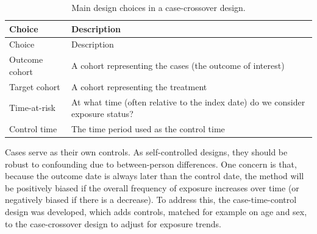 \documentclass[11pt]{book}
\theoremstyle{definition}
\theoremstyle{definition}
\theoremstyle{definition}
\theoremstyle{remark}
\begin{document}
\begin{longtable}[]{@{}ll@{}}
\caption{\label{tab:ccrChoices} Main design choices in a case-crossover design.}\tabularnewline
\toprule
\begin{minipage}[b]{0.23\columnwidth}\raggedright
Choice\strut
\end{minipage} & \begin{minipage}[b]{0.72\columnwidth}\raggedright
Description\strut
\end{minipage}\tabularnewline
\midrule
\endfirsthead
\toprule
\begin{minipage}[b]{0.23\columnwidth}\raggedright
Choice\strut
\end{minipage} & \begin{minipage}[b]{0.72\columnwidth}\raggedright
Description\strut
\end{minipage}\tabularnewline
\midrule
\endhead
\begin{minipage}[t]{0.23\columnwidth}\raggedright
Outcome cohort\strut
\end{minipage} & \begin{minipage}[t]{0.72\columnwidth}\raggedright
A cohort representing the cases (the outcome of interest)\strut
\end{minipage}\tabularnewline
\begin{minipage}[t]{0.23\columnwidth}\raggedright
Target cohort\strut
\end{minipage} & \begin{minipage}[t]{0.72\columnwidth}\raggedright
A cohort representing the treatment\strut
\end{minipage}\tabularnewline
\begin{minipage}[t]{0.23\columnwidth}\raggedright
Time-at-risk\strut
\end{minipage} & \begin{minipage}[t]{0.72\columnwidth}\raggedright
At what time (often relative to the index date) do we consider exposure status?\strut
\end{minipage}\tabularnewline
\begin{minipage}[t]{0.23\columnwidth}\raggedright
Control time\strut
\end{minipage} & \begin{minipage}[t]{0.72\columnwidth}\raggedright
The time period used as the control time\strut
\end{minipage}\tabularnewline
\bottomrule
\end{longtable}

Cases serve as their own controls. As self-controlled designs, they should be robust to confounding due to between-person differences. One concern is that, because the outcome date is always later than the control date, the method will be positively biased if the overall frequency of exposure increases over time (or negatively biased if there is a decrease). To address this, the case-time-control design \citep{suissa_1995} was developed, which adds controls, matched for example on age and sex, to the case-crossover design to adjust for exposure trends. 
\end{document}
